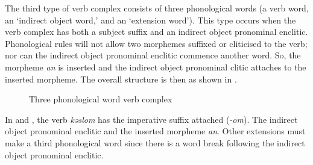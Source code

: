 The third type of verb complex consists of three phonological words (a verb word, an ‘indirect object word,’ and an ‘extension word’). This type occurs when the verb complex has both a subject suffix and an indirect object pronominal enclitic. Phonological rules will not allow two morphemes suffixed or cliticised to the verb; nor can the indirect object pronominal enclitic commence another word. So, the morpheme \textit{an} is inserted and the indirect object pronominal clitic attaches to the inserted morpheme. The overall structure is then as shown in .

\begin{figure}
\caption{Three phonological word verb complex\label{fig:7.3}}
\end{figure}

In  and , the verb \textit{kəslom }has the {\twoP} imperative suffix attached (\textit{-om}). The indirect object pronominal enclitic and the inserted morpheme \textit{an}. Other extensions must make a third phonological word since there is a word break following the indirect object pronominal enclitic. 


